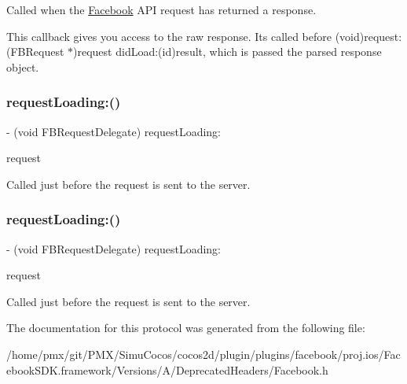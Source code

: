 Called when the \hyperlink{interfaceFacebook}{Facebook} A\+PI request has returned a response.

This callback gives you access to the raw response. It\textquotesingle{}s called before (void)request\+:(\+F\+B\+Request $\ast$)request did\+Load\+:(id)result, which is passed the parsed response object. \mbox{\label{protocolFBRequestDelegate_01-p_a9b63bbe739fddbe829f2560dbe53bb07}} 
\subsubsection{\texorpdfstring{request\+Loading\+:()}{requestLoading:()}\hspace{0.1cm}{\footnotesize\ttfamily [1/2]}}
{\footnotesize\ttfamily -\/ (void F\+B\+Request\+Delegate) request\+Loading\+: \begin{DoxyParamCaption}\item[{(\hyperlink{interfaceFBRequest}{F\+B\+Request} $\ast$)}]{request }\end{DoxyParamCaption}\hspace{0.3cm}{\ttfamily [optional]}}

Called just before the request is sent to the server. \mbox{\label{protocolFBRequestDelegate_01-p_a9b63bbe739fddbe829f2560dbe53bb07}} 
\subsubsection{\texorpdfstring{request\+Loading\+:()}{requestLoading:()}\hspace{0.1cm}{\footnotesize\ttfamily [2/2]}}
{\footnotesize\ttfamily -\/ (void F\+B\+Request\+Delegate) request\+Loading\+: \begin{DoxyParamCaption}\item[{(\hyperlink{interfaceFBRequest}{F\+B\+Request} $\ast$)}]{request }\end{DoxyParamCaption}\hspace{0.3cm}{\ttfamily [optional]}}

Called just before the request is sent to the server. 

The documentation for this protocol was generated from the following file\+:\begin{DoxyCompactItemize}
\item 
/home/pmx/git/\+P\+M\+X/\+Simu\+Cocos/cocos2d/plugin/plugins/facebook/proj.\+ios/\+Facebook\+S\+D\+K.\+framework/\+Versions/\+A/\+Deprecated\+Headers/Facebook.\+h\end{DoxyCompactItemize}
